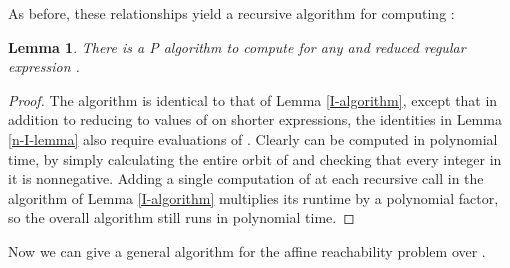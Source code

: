 \documentclass[11pt]{amsart}
\newtheorem{lemma}{Lemma}
\theoremstyle{definition}
\theoremstyle{remark}
\begin{document}
As before, these relationships yield a recursive algorithm for computing :
\begin{lemma} \label{n-I-algorithm}
There is a \textsf{P} algorithm to compute  for any  and reduced regular expression .
\end{lemma}
\begin{proof}
The algorithm is identical to that of Lemma \ref{I-algorithm}, except that in addition to reducing  to values of  on shorter expressions, the identities in Lemma \ref{n-I-lemma} also require evaluations of . Clearly  can be computed in polynomial time, by simply calculating the entire orbit of  and checking that every integer in it is nonnegative. Adding a single computation of  at each recursive call in the algorithm of Lemma \ref{I-algorithm} multiplies its runtime by a polynomial factor, so the overall algorithm still runs in polynomial time.
\end{proof}

Now we can give a general algorithm for the affine reachability problem over .
\end{document}
